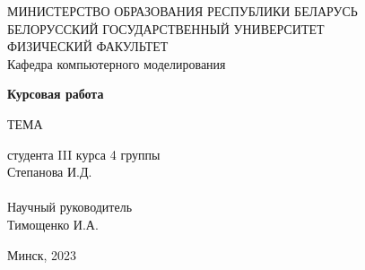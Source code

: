 \thispagestyle{empty}

\begin{center}
    МИНИСТЕРСТВО ОБРАЗОВАНИЯ РЕСПУБЛИКИ БЕЛАРУСЬ \\ 
    БЕЛОРУССКИЙ ГОСУДАРСТВЕННЫЙ УНИВЕРСИТЕТ \\ 
    ФИЗИЧЕСКИЙ ФАКУЛЬТЕТ \\
    Кафедра компьютерного моделирования
\end{center}

\vspace{224pt}

\begin{center}
    \textbf{Курсовая работа}

    \vfill

    ТЕМА
    
\end{center}

\vfill

\hspace{80mm}
\vbox
{
    \noindent студента III курса 4 группы\\
    Степанова И.Д.\\\\

    \noindent Научный руководитель\\
    Тимощенко И.А.
}

\vfill

\begin{center}
    Минск, 2023
\end{center}